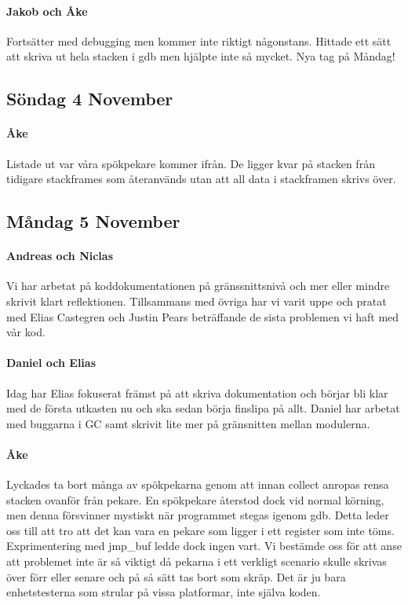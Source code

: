 \documentclass{article}
\begin{document}
\paragraph*{Jakob och Åke} Fortsätter med debugging men kommer inte riktigt någonstans. Hittade ett sätt att skriva ut hela stacken i gdb men hjälpte inte så mycket. Nya tag på Måndag!

\subsection{Söndag 4 November}
\paragraph*{Åke} Listade ut var våra spökpekare kommer ifrån. De ligger kvar på stacken från tidigare stackframes som återanvänds utan att all data i stackframen skrivs över.

\subsection{Måndag 5 November}
\paragraph*{Andreas och Niclas} Vi har arbetat på koddokumentationen på gränssnittsnivå och mer eller mindre skrivit klart reflektionen. Tillsammans med övriga har vi varit uppe och pratat med Elias Castegren och Justin Pears beträffande de sista problemen vi haft med vår kod.

\paragraph*{Daniel och Elias} Idag har Elias fokuserat främst på att skriva dokumentation och börjar bli klar med de första utkasten nu och ska sedan börja finslipa på allt. Daniel har arbetat med buggarna i GC samt skrivit lite mer på gränsnitten mellan modulerna.

\paragraph*{Åke} Lyckades ta bort många av spökpekarna genom att innan collect anropas rensa stacken ovanför från pekare. En spökpekare återstod dock vid normal körning, men denna försvinner mystiskt när programmet stegas igenom gdb. Detta leder oss till att tro att det kan vara en pekare som ligger i ett register som inte töms. Exprimentering med jmp\_buf ledde dock ingen vart. Vi bestämde oss för att anse att problemet inte är så viktigt då pekarna i ett verkligt scenario skulle skrivas över förr eller senare och på så sätt tas bort som skräp. Det är ju bara enhetstesterna som strular på vissa platformar, inte själva koden.
\end{document}
